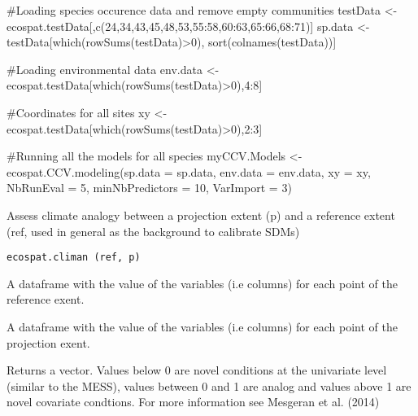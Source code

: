 \documentclass[a4paper]{book}
\begin{document}
%
\begin{Examples}
\begin{ExampleCode}
#Loading species occurence data and remove empty communities
testData <- ecospat.testData[,c(24,34,43,45,48,53,55:58,60:63,65:66,68:71)]
sp.data <- testData[which(rowSums(testData)>0), sort(colnames(testData))]

#Loading environmental data
env.data <- ecospat.testData[which(rowSums(testData)>0),4:8]

#Coordinates for all sites
xy <- ecospat.testData[which(rowSums(testData)>0),2:3]

#Running all the models for all species
myCCV.Models <- ecospat.CCV.modeling(sp.data = sp.data,
                                     env.data = env.data,
                                     xy = xy,
                                     NbRunEval = 5,
                                     minNbPredictors = 10,
                                     VarImport = 3)
\end{ExampleCode}
\end{Examples}
%
\begin{Description}\relax
Assess climate analogy between a projection extent (p) and a reference extent (ref, used in general as the background to calibrate SDMs)
\end{Description}
%
\begin{Usage}
\begin{verbatim}
ecospat.climan (ref, p)
\end{verbatim}
\end{Usage}
%
\begin{Arguments}
\begin{ldescription}
\item[\code{ref}] A dataframe with the value of the variables (i.e columns) for each point of the reference exent.
\item[\code{p}] A dataframe with the value of the variables (i.e columns) for each point of the projection exent.

\end{ldescription}
\end{Arguments}
%
\begin{Value}
Returns a vector. Values below 0 are novel conditions at the univariate level (similar to the MESS), values between 0 and 1 are analog and values above 1 are novel covariate condtions. 
For more information see Mesgeran et al. (2014)
\end{Value}
\end{document}
